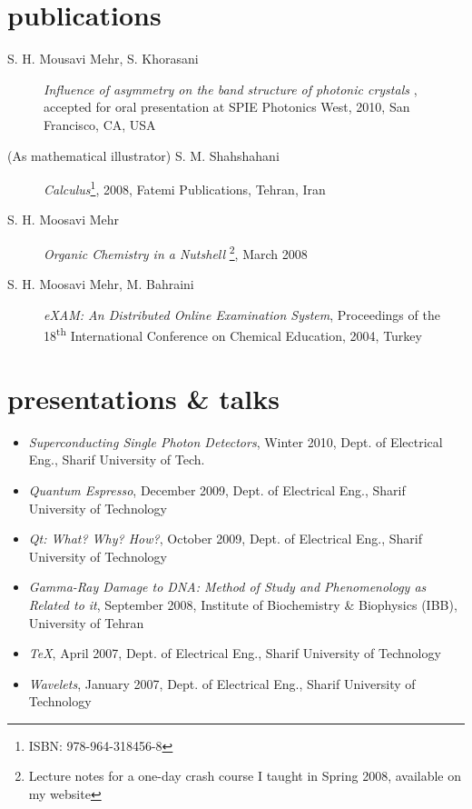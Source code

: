\documentclass[overlapped,line,10pt,letterpaper]{res}
\begin{document}
\begin{resume}
\section{publications}
\begin{description}
\item[S. H. Mousavi Mehr, S. Khorasani] \emph{Influence of asymmetry on the band structure of photonic crystals }, accepted for oral presentation at SPIE Photonics West, 2010, San Francisco, CA, USA
\item [(As mathematical illustrator) S. M. Shahshahani] \emph{Calculus}\footnote{ ISBN: 978-964-318456-8}, 2008, Fatemi Publications, Tehran, Iran
\item[S. H. Moosavi Mehr] \emph{Organic Chemistry in a Nutshell} \footnote{Lecture notes for a one-day crash course I taught in Spring 2008, available on my website}, March 2008
\item[S. H. Moosavi Mehr, M. Bahraini] \emph{eXAM: An Distributed Online Examination System}, Proceedings of the 18\textsuperscript{th} International Conference on Chemical Education, 2004, Turkey
\end{description}

\section{presentations \& talks}
\begin{itemize}
\item \emph{Superconducting Single Photon Detectors}, Winter 2010, Dept. of Electrical Eng., Sharif University of Tech.
\item \emph{Quantum Espresso}, December 2009, Dept. of Electrical Eng., Sharif  University of Technology
\item \emph{Qt: What? Why? How?}, October 2009, Dept. of Electrical Eng., Sharif University of Technology
\item \emph{Gamma-Ray Damage to DNA: Method of Study and Phenomenology as Related to it}, September 2008, Institute of Biochemistry \& Biophysics (IBB), University of Tehran
\item \emph{\TeX}, April 2007, Dept. of Electrical Eng., Sharif University of Technology
\item \emph{Wavelets}, January 2007, Dept. of Electrical Eng., Sharif University of Technology
\end{itemize}


\end{resume}
\end{document}
